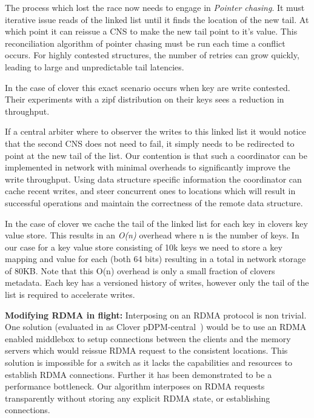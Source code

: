 The process which lost the race now needs to engage in \textit{Pointer
chasing}. It must iterative issue reads of the linked list until it
finds the location of the new tail. At which point it can reissue a
CNS to make the new tail point to it's value. This reconciliation
algorithm of pointer chasing must be run each time a conflict occurs.
For highly contested structures, the number of retries can grow
quickly, leading to large and unpredictable tail latencies.

In the case of clover this exact scenario occurs when key are write
contested. Their experiments with a zipf distribution on their keys
sees a  reduction in throughput.

If a central arbiter where to observer the writes to this linked list
it would notice that the second CNS does not need to fail, it simply
needs to be redirected to point at the new tail of the list. 
Our contention is that such a coordinator can be implemented in
network with minimal overheads to significantly improve the write
throughput. Using data structure specific information the coordinator
can cache recent writes, and steer concurrent ones to locations which
will result in successful operations and maintain the correctness of
the remote data structure.

In the case of clover we cache the tail of the linked list for each
key in clovers key value store. This results in an \textit{O(n)}
overhead where n is the number of keys. In our case for a key value
store consisting of 10k keys we need to store a key mapping and value
for each (both 64 bits) resulting in a total in network storage of
80KB. Note that this O(n) overhead is only a small fraction of clovers
metadata. Each key has a versioned history of writes, however only the
tail of the list is required to accelerate writes.

\textbf{Modifying RDMA in flight:} Interposing on an RDMA protocol is non
trivial. One solution (evaluated in as Clover
pDPM-central~\cite{clover}) would be to use an RDMA enabled middlebox
to setup connections between the clients and the memory servers which
would reissue RDMA request to the consistent locations. This solution
is impossible for a switch as it lacks the capabilities and resources
to establish RDMA connections. Further it has been demonstrated to be
a performance bottleneck. Our algorithm interposes on RDMA requests
transparently without storing any explicit RDMA state, or establishing
connections.

